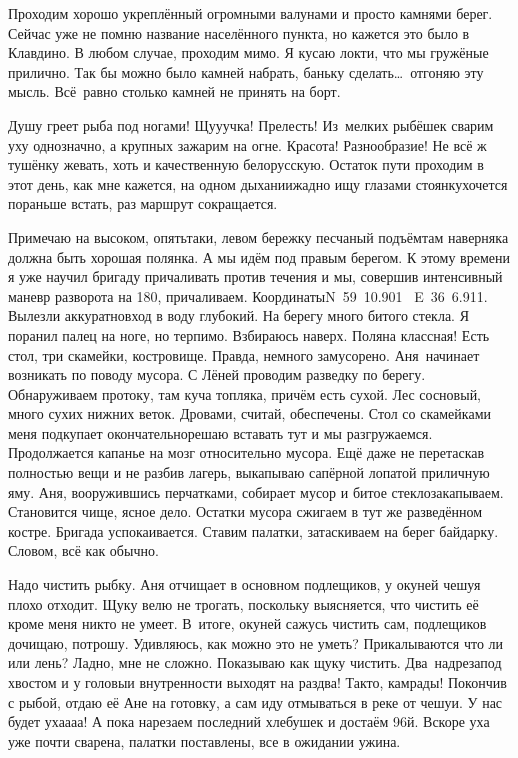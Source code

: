 Проходим хорошо укреплённый огромными валунами и просто камнями берег. Сейчас уже не помню название населённого пункта, но кажется это было в Клавдино. В любом случае, проходим мимо. Я кусаю локти, что мы гружёные прилично. Так бы можно было камней набрать, баньку сделать\ldots~отгоняю эту мысль. Всё~равно столько камней не принять на борт.

Душу греет рыба под ногами! Щу\sdash у\sdash учка! Прелесть! Из~мелких рыбёшек сварим уху однозначно, а крупных зажарим на огне. Красота! Разнообразие! Не всё ж тушёнку жевать, хоть и качественную белорусскую. Остаток пути проходим в этот день, как мне кажется, на одном дыхании\mdash жадно ищу глазами стоянку\mdash хочется пораньше встать, раз маршрут сокращается. 

Примечаю на высоком, опять\sdash таки, левом бережку песчаный подъём\mdash там наверняка должна быть хорошая полянка. А мы идём под правым берегом. К этому времени я уже научил бригаду причаливать против течения и мы, совершив интенсивный маневр разворота на 180\degree, причаливаем. Координаты\mdash N~59\degree~10.901\textprime~ E~36\degree~6.911\textprime. Вылезли аккуратно\mdash вход в воду глубокий. На берегу много битого стекла. Я поранил палец на ноге, но терпимо. Взбираюсь наверх. Поляна классная! Есть стол, три скамейки, костровище. Правда, немного замусорено. Аня~начинает возникать по поводу мусора. С Лёней проводим разведку по берегу. Обнаруживаем протоку, там куча топляка, причём есть сухой. Лес сосновый, много сухих нижних веток. Дровами, считай, обеспечены. Стол со скамейками меня подкупает окончательно\mdash решаю вставать тут и мы разгружаемся. Продолжается капанье на мозг относительно мусора. Ещё даже не перетаскав полностью вещи и не разбив лагерь, выкапываю сапёрной лопатой приличную яму. Аня, вооружившись перчатками, собирает мусор и битое стекло\mdash закапываем. Становится чище, ясное дело. Остатки мусора сжигаем в тут же разведённом костре. Бригада успокаивается. Ставим палатки, затаскиваем на берег байдарку. Словом, всё как обычно. 

Надо чистить рыбку. Аня отчищает в основном подлещиков, у окуней чешуя плохо отходит. Щуку велю не трогать, поскольку выясняется, что чистить её кроме меня никто не умеет. В~итоге, окуней сажусь чистить сам, подлещиков дочищаю, потрошу. Удивляюсь, как можно это не уметь? Прикалываются что ли или лень? Ладно, мне не сложно. Показываю как щуку чистить. Два~надреза\mdash под хвостом и у головы\mdash и внутренности выходят на раз\sdash два! Так\sdash то, камрады! Покончив с рыбой, отдаю её Ане на готовку, а сам иду отмываться в реке от чешуи. У нас будет уха\sdash а\sdash а\sdash а! А пока нарезаем последний хлебушек и достаём 96\sdash й. Вскоре уха уже почти сварена, палатки поставлены, все в ожидании ужина. 

